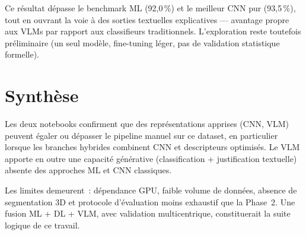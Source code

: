 Ce résultat dépasse le benchmark ML (92,0\,\%) et le meilleur CNN pur (93,5\,\%), tout en
ouvrant la voie à des sorties textuelles explicatives --- avantage propre aux VLMs par rapport
aux classifieurs traditionnels. L'exploration reste toutefois préliminaire (un seul modèle,
fine-tuning léger, pas de validation statistique formelle).

\section{Synthèse}

Les deux notebooks confirment que des représentations apprises (CNN, VLM) peuvent égaler ou
dépasser le pipeline manuel sur ce dataset, en particulier lorsque les branches hybrides
combinent CNN et descripteurs optimisés. Le VLM apporte en outre une capacité générative
(classification + justification textuelle) absente des approches ML et CNN classiques.

Les limites demeurent~: dépendance GPU, faible volume de données, absence de segmentation 3D
et protocole d'évaluation moins exhaustif que la Phase~2. Une fusion ML + DL + VLM, avec
validation multicentrique, constituerait la suite logique de ce travail.
